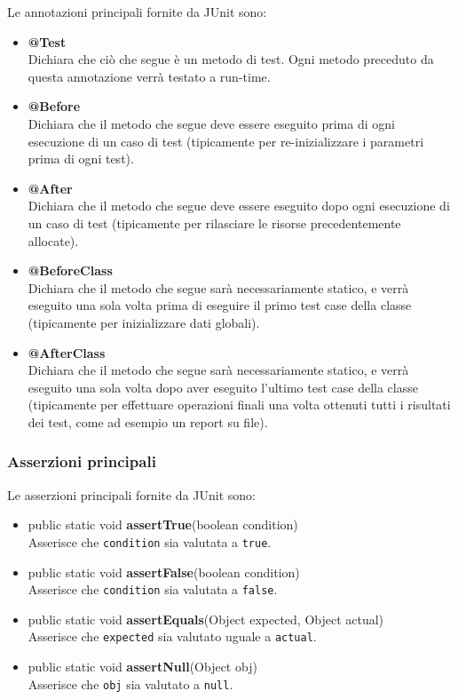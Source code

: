Le annotazioni principali fornite da JUnit sono:\\
\begin{itemize}
\item \textbf{@Test}\\Dichiara che ciò che segue è un metodo di test. Ogni metodo preceduto da questa annotazione verrà testato a run-time.\\
\item \textbf{@Before}\\Dichiara che il metodo che segue deve essere eseguito prima di ogni esecuzione di un caso di test (tipicamente per re-inizializzare i parametri prima di ogni test).\\
\item \textbf{@After}\\Dichiara che il metodo che segue deve essere eseguito dopo ogni esecuzione di un caso di test (tipicamente per rilasciare le risorse precedentemente allocate).\\
\item \textbf{@BeforeClass}\\Dichiara che il metodo che segue sarà necessariamente statico, e verrà eseguito una sola volta prima di eseguire il primo test case della classe (tipicamente per inizializzare dati globali).\\
\item \textbf{@AfterClass}\\Dichiara che il metodo che segue sarà necessariamente statico, e verrà eseguito una sola volta dopo aver eseguito l'ultimo test case della classe (tipicamente per effettuare operazioni finali una volta ottenuti tutti i risultati dei test, come ad esempio un report su file).\\
\end{itemize}

\subsubsection{Asserzioni principali}

Le asserzioni principali fornite da JUnit sono:\\
\begin{itemize}
\item public static void \textbf{assertTrue}(boolean condition)\\Asserisce che \texttt{condition} sia valutata a \texttt{true}.\\
\item public static void \textbf{assertFalse}(boolean condition)\\Asserisce che \texttt{condition} sia valutata a \texttt{false}.\\
\item public static void \textbf{assertEquals}(Object expected, Object actual)\\Asserisce che \texttt{expected} sia valutato uguale a \texttt{actual}.\\
\item public static void \textbf{assertNull}(Object obj)\\Asserisce che \texttt{obj} sia valutato a \texttt{null}.\\
\end{itemize}

